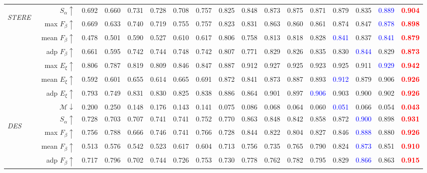 \documentclass[journal]{IEEEtran}
\newcommand{\trb}[1]{\textbf{\textcolor{red}{#1}}}
\newcommand{\tbb}[1]{\textcolor{blue}{#1}}
\newcommand{\STERE}{\textit{STERE}~\cite{niu2012leveraging}}
\newcommand{\DES}{\textit{DES}~\cite{cheng2014depth}}
\begin{document}
\begin{table*}[t!]
\begin{tabular}{lr|ccccc|ccccccccc|c}
		\midrule
		\multirow{8}{*}{\begin{sideways}\STERE\end{sideways}}
		& $S_{\alpha}\uparrow$    & 0.692 & 0.660 & 0.731 & 0.728 & 0.708 & 0.757 & 0.825 & 0.848 & 0.873 & 0.875 & 0.871 & 0.879 & 0.835 & \tbb{0.889} & \trb{0.904} \\
		& max $F_{\beta}\uparrow$    & 0.669 & 0.633 & 0.740 & 0.719 & 0.755 & 0.757 & 0.823 & 0.831 & 0.863 & 0.860 & 0.861 & 0.874 & 0.847 & \tbb{0.878} & \trb{0.898} \\
		& mean $F_{\beta}\uparrow$     & 0.478 & 0.501 & 0.590 & 0.527 & 0.610 & 0.617 & 0.806 & 0.758 & 0.813 & 0.818 & 0.828 & \tbb{0.841} & 0.837 & \tbb{0.841} & \trb{0.879} \\
		& adp $F_{\beta}\uparrow$     & 0.661 & 0.595 & 0.742 & 0.744 & 0.748 & 0.742 & 0.807 & 0.771 & 0.829 & 0.826 & 0.835 & 0.830  & \tbb{0.844} & 0.829 & \trb{0.873} \\
		& max $E_{\xi}\uparrow$      & 0.806 & 0.787 & 0.819 & 0.809 & 0.846 & 0.847 & 0.887 & 0.912 & 0.927 & 0.925 & 0.923 & 0.925 & 0.911 & \tbb{0.929} & \trb{0.942} \\
		& mean $E_{\xi}\uparrow$     & 0.592 & 0.601 & 0.655 & 0.614 & 0.665 & 0.691 & 0.872 & 0.841 & 0.873 & 0.887 & 0.893 & \tbb{0.912} & 0.879 & 0.906 & \trb{0.926} \\
		& adp $E_{\xi}\uparrow$     & 0.793 & 0.749 & 0.831 & 0.830 & 0.825 & 0.838 & 0.886 & 0.864 & 0.901 & 0.897 & \tbb{0.906} & 0.903 & 0.900 & 0.902 & \trb{0.926} \\
		& $\mathcal{M}\downarrow$ & 0.200 & 0.250 & 0.148 & 0.176 & 0.143 & 0.141 & 0.075 & 0.086 & 0.068 & 0.064 & 0.060 & \tbb{0.051} & 0.066 & 0.054 & \trb{0.043} \\
		\midrule
		\multirow{8}{*}{\begin{sideways}\DES\end{sideways}}
		& $S_{\alpha}\uparrow$    & 0.728 & 0.703 & 0.707 & 0.741 & 0.741 & 0.752 & 0.770 & 0.863 & 0.848 & 0.842 & 0.858 & 0.872 & \tbb{0.900} & 0.898 & \trb{0.931} \\
		& max $F_{\beta}\uparrow$     & 0.756 & 0.788 & 0.666 & 0.746 & 0.741 & 0.766 & 0.728 & 0.844 & 0.822 & 0.804 & 0.827 & 0.846 & \tbb{0.888} & 0.880 & \trb{0.926} \\
		& mean $F_{\beta}\uparrow$     & 0.513 & 0.576 & 0.542 & 0.523 & 0.617 & 0.604 & 0.713 & 0.756 & 0.735 & 0.765 & 0.790 & 0.824 & \tbb{0.873} & 0.851 & \trb{0.910} \\
		& adp $F_{\beta}\uparrow$     & 0.717 & 0.796 & 0.702 & 0.744 & 0.726 & 0.753 & 0.730 & 0.778 & 0.762 & 0.782 & 0.795 & 0.829 & \tbb{0.866} & 0.863 & \trb{0.915} \\

\end{tabular}
\end{table*}
\end{document}
